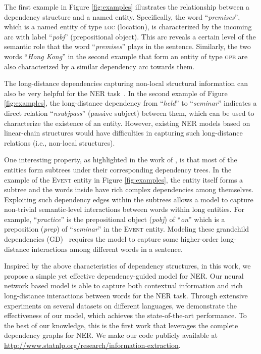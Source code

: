 \documentclass[11pt,a4paper]{article}
\begin{document}
The first example in Figure \ref{fig:examples} illustrates the relationship between a dependency structure and a named entity. 
Specifically, the word ``{\it premises}'', which is a named entity of type \textsc{loc} (location), is characterized by the incoming arc with label ``{\it pobj}'' (prepositional object). 
This arc reveals a certain level of the semantic role that the word ``{\it premises}'' plays in the sentence. 
Similarly, the two words ``{\it Hong Kong}'' in the second example that form an entity of type \textsc{gpe} are also characterized by a similar dependency arc towards them.




The long-distance dependencies capturing non-local structural information can also be very helpful for the NER task~\cite{finkel2005incorporating}. 
In the second example of Figure \ref{fig:examples}, the long-distance dependency from ``\textit{held}'' to ``\textit{seminar}'' indicates a direct relation ``\textit{nsubjpass}'' (passive subject) between them, which can be used to characterize the existence of an entity. 
However, existing NER models based on linear-chain structures would have difficulties in capturing such long-distance relations (i.e., non-local structures).

One interesting property, as highlighted in the work of \citet{jie2017efficient}, is that most of the entities form subtrees under their corresponding dependency trees. 
In the example of the \textsc{Event} entity in Figure \ref{fig:examples}, the entity itself forms a subtree and the words inside have rich complex dependencies among themselves. 
Exploiting such dependency edges within the subtrees allows a model to capture non-trivial semantic-level interactions between words within long entities.
For example, ``\textit{practice}'' is the prepositional object (\textit{pobj}) of ``\textit{on}'' which is a preposition (\textit{prep}) of ``\textit{seminar}'' in the \textsc{Event} entity. 
Modeling these grandchild dependencies (GD)~\cite{koo2010efficient} requires the model to capture some higher-order long-distance interactions among different words in a sentence.






Inspired by the above characteristics of dependency structures, in this work, we propose a simple yet effective dependency-guided model for NER. 
Our neural network based model is able to capture both contextual information and rich long-distance interactions between words for the NER task. 
Through extensive experiments on several datasets on different languages, we demonstrate the effectiveness of our model, which achieves the state-of-the-art performance. 
To the best of our knowledge, this is the first work that leverages the complete dependency graphs for NER.
 We make our code publicly available at \url{http://www.statnlp.org/research/information-extraction}.
\end{document}

